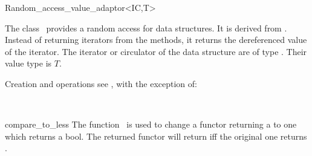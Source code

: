 \begin{ccRefClass}{Random_access_value_adaptor<IC,T>}
  
  \ccDefinition The class \ccClassTemplateName\ provides a random
  access for data structures. It is derived from
  . Instead of returning iterators from
  the  methods, it returns the dereferenced value of
  the iterator.  The iterator or circulator of the data structure are
  of type . Their value type is $T$.


  \ccOperations
  
  Creation and operations see , with
  the exception of:
  

  
  
  \ccSeeAlso
  \\

\end{ccRefClass}


\begin{ccRefFunction}{compare_to_less}
  \ccDefinition The function \ccRefName\ is used to change a functor
  returning a  to one which returns a bool.
  The returned functor will return  iff the original one
  returns .
  
  
  
  
  \ccSeeAlso
  
\end{ccRefFunction}

